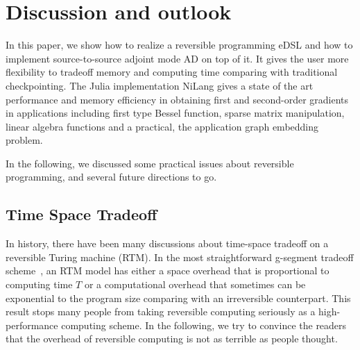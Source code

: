\documentclass[aps,twocolumn,longbibliography,english,superscriptaddress]{revtex4-1}
\newcommand{\<}{\langle}
\renewcommand{\>}{\rangle}
\theoremstyle{definition}\newtheorem{definition}{\textit{Definition}}
\begin{document}
\section{Discussion and outlook}\label{sec:discussion}
In this paper, we show how to realize a reversible programming eDSL and how to implement source-to-source adjoint mode AD on top of it.
It gives the user more flexibility to tradeoff memory and computing time comparing with traditional checkpointing.
The Julia implementation NiLang gives a state of the art performance and memory efficiency in obtaining first and second-order gradients in applications including first type Bessel function, sparse matrix manipulation, linear algebra functions and a practical, the application graph embedding problem.

In the following, we discussed some practical issues about reversible programming, and several future directions to go.

\subsection{Time Space Tradeoff}\label{sec:timespace}
In history, there have been many discussions about time-space tradeoff on a reversible Turing machine (RTM).
In the most straightforward g-segment tradeoff scheme~\cite{Bennett1989,Levine1990}, an RTM model has either a space overhead that is proportional to computing time $T$ or a computational overhead that sometimes can be exponential to the program size comparing with an irreversible counterpart.
This result stops many people from taking reversible computing seriously as a high-performance computing scheme.
In the following, we try to convince the readers that the overhead of reversible computing is not as terrible as people thought.
\end{document}
